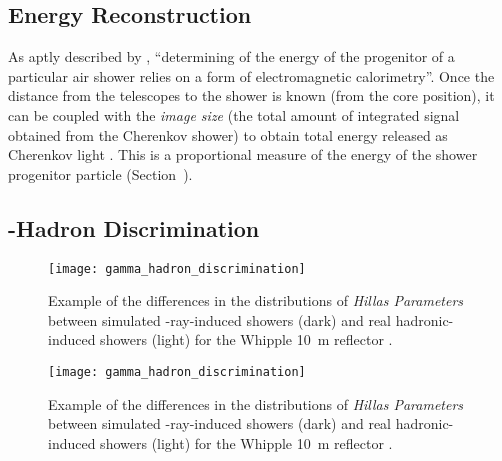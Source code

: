 \subsection{Energy Reconstruction}

As aptly described by \textcite[][p.~16]{Dickinson2010}, ``determining of the energy of the progenitor of a particular air shower relies on a form of electromagnetic calorimetry''. Once the distance from the telescopes to the shower is known (from the core position), it can be coupled with the \textit{image size} (the total amount of integrated signal obtained from the Cherenkov shower) to obtain total energy released as Cherenkov light \cite{Cogan2006,Bernlohr2013a}. This is a proportional measure of the energy of the shower progenitor particle (Section~).

\subsection{\textgamma-Hadron Discrimination}

\begin{figure}
	\centering
    \texttt{[image: gamma\_hadron\_discrimination]} 
	\caption[Discriminating between images of gamma-ray and hadron induced showers.]{Example of the differences in the distributions of \textit{Hillas Parameters} between simulated \textgamma-ray-induced showers (dark) and real hadronic-induced showers (light) for the Whipple \SI{10}{m} reflector \cite{Fegan1999a}.}
	\label{fig:gamma_hadron_discrimination}
\end{figure}

\begin{figure}
	\centering
    \texttt{[image: gamma\_hadron\_discrimination]} 
	\caption[Discriminating between images of gamma-ray and hadron induced showers.]{Example of the differences in the distributions of \textit{Hillas Parameters} between simulated \textgamma-ray-induced showers (dark) and real hadronic-induced showers (light) for the Whipple \SI{10}{m} reflector \cite{Fegan1999a}.}
	\label{fig:gamma_hadron_discrimination}
\end{figure}

